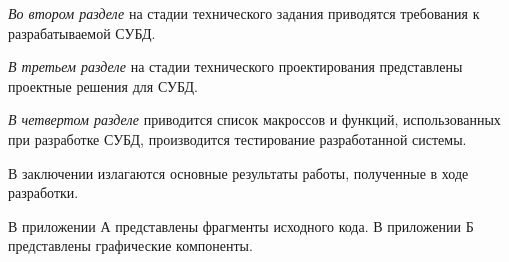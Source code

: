 \emph{Во втором разделе} на стадии технического задания приводятся требования к разрабатываемой СУБД.

\emph{В третьем разделе} на стадии технического проектирования представлены проектные решения для СУБД.

\emph{В четвертом разделе} приводится список макроссов и функций, использованных при разработке СУБД, производится тестирование разработанной системы.

В заключении излагаются основные результаты работы, полученные в ходе разработки.

В приложении А представлены фрагменты исходного кода. 
В приложении Б представлены графические компоненты.
